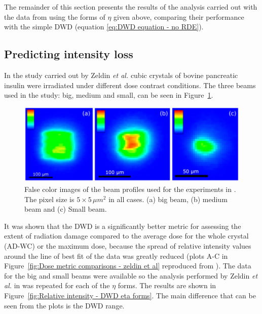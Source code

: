 The remainder of this section presents the results of the analysis carried out with the data from \cite{zeldin2013dwd} using the forms of $\eta$ given above, comparing their performance with the simple DWD (equation \ref{eq:DWD equation - no RDE}).

\subsection{Predicting intensity loss}
\label{sub:Predicting intensity loss}
In the study carried out by Zeldin \textit{et al.} \cite{zeldin2013dwd} cubic crystals of bovine pancreatic insulin were irradiated under different dose contrast conditions.
The three beams used in the study: big, medium and small, can be seen in Figure~\ref{fig:Big, medium and small beams - Oli experiment}.
\begin{figure}
  \centering
    \includegraphics[width=1\textwidth]{figures/dwd/Oli_beams.png}
    \caption[Beam profiles used in the varying dose contrast regime experiment in \cite{zeldin2013dwd}.]{False color images of the beam profiles used for the experiments in \cite{zeldin2013dwd}.
    The pixel size is $\text{5} \times \text{5}\,\mu m^2$ in all cases.
    (a) big beam, (b) medium beam and (c) Small beam.}
    \label{fig:Big, medium and small beams - Oli experiment}
\end{figure}
It was shown that the DWD is a significantly better metric for assessing the extent of radiation damage compared to the average dose for the whole crystal (AD-WC) or the maximum dose, because the spread of relative intensity values around the line of best fit of the data was greatly reduced (plots A-C in Figure~\ref{fig:Dose metric comparisons - zeldin et al} reproduced from \cite{zeldin2013dwd}).
The data for the big and small beams were available so the analysis performed by Zeldin \textit{et al.} in \cite{zeldin2013dwd} was repeated for each of the $\eta$ forms.
The results are shown in Figure~\ref{fig:Relative intensity - DWD eta forms}.
The main difference that can be seen from the plots is the DWD range.
